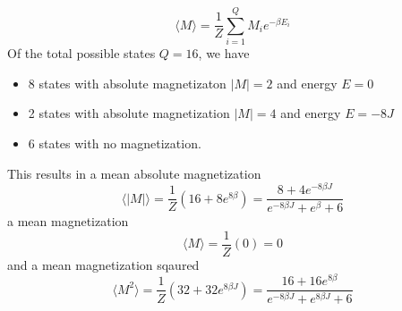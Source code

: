 \documentclass[10pt,a4paper]{article}
\begin{document}
\begin{equation}
\langle M \rangle = \frac{1}{Z} \sum\limits_{i=1}^Q M_i e^{-\beta E_i}
\end{equation}
Of the total possible states $Q = 16$, we have
\begin{itemize}
\item 8 states with absolute magnetizaton $|M| = 2$ and energy $E = 0$
\item 2 states with absolute magnetization $|M| = 4$ and energy $E = -8J$
\item 6 states with no magnetization.
\end{itemize}
This results in a mean absolute magnetization
\begin{equation}
\langle |M| \rangle = \frac{1}{Z} (16+8e^{8\beta}) = \frac{8+4e^{-8\beta J}}{e^{-8\beta J} + e^{\beta} + 6}
\end{equation}
a mean magnetization
\begin{equation}
\langle M \rangle = \frac{1}{Z} (0) = 0
\end{equation}
and a mean magnetization sqaured
\begin{equation}
\langle M^2 \rangle = \frac{1}{Z} (32+32e^{8\beta J}) = \frac{16 + 16e^{8\beta}}{e^{-8\beta J} + e^{8\beta J} + 6}
\end{equation}









\printbibliography %
\end{document}

